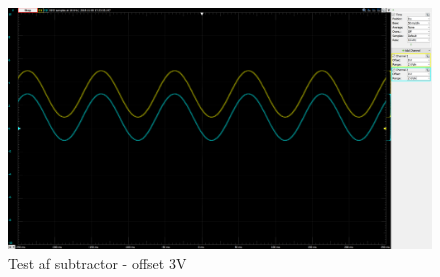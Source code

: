 \begin{figure}[h!]
	\centering
	\includegraphics[width=1\linewidth]{Hardwaredesign/Subtractor4}
	\caption{Test af subtractor - offset 3V}
	\label{fig:Subtractor4}
\end{figure}
